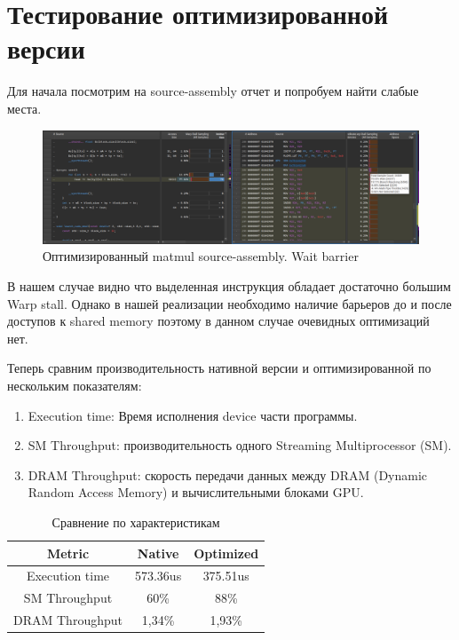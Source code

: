 \documentclass[a4paper,12pt]{article}
\begin{document}
\section{Тестирование оптимизированной версии}
Для начала посмотрим на source-assembly отчет и попробуем найти слабые места.

\begin{figure}[h]
  \centering
  \includegraphics[width=1.0\textwidth]{img/optimized_sa.png}
  \caption{Оптимизированный matmul source-assembly. Wait barrier}
  \label{fig:image_label}
\end{figure}

В нашем случае видно что выделенная инструкция обладает достаточно большим Warp stall. 
Однако в нашей реализации необходимо наличие барьеров до и после доступов к shared memory
поэтому в данном случае очевидных оптимизаций нет.

\newpage

Теперь сравним производительность нативной версии и оптимизированной по нескольким показателям:

\begin{enumerate}
  \item Execution time: Время исполнения device части программы.
  \item SM Throughput: производительность одного Streaming Multiprocessor (SM).
  \item DRAM Throughput: скорость передачи данных между DRAM (Dynamic Random Access Memory) и вычислительными блоками GPU.
\end{enumerate}

\begin{table}[h]
  \centering
  \begin{tabular}{|c|c|c|}
  \hline
  Metric & Native & Optimized \\ \hline
  Execution time & 573.36us & 375.51us \\ \hline
  SM Throughput & 60\% & 88\% \\ \hline
  DRAM Throughput & 1,34\% & 1,93\% \\ \hline
  \end{tabular}
  \caption{Сравнение по характеристикам}
\end{table}
\end{document}
